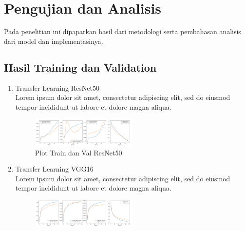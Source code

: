\section{Pengujian dan Analisis}
\label{sec:PengujianAnalisa}

Pada penelitian ini dipaparkan hasil dari metodologi serta pembahasan analisis dari model dan implementasinya.

\subsection{Hasil Training dan Validation}
\label{sec:hasiltrainval}

\begin{enumerate}[nolistsep]

  \item Transfer Learning ResNet50 \\
  Lorem ipsum dolor sit amet, consectetur adipiscing elit, sed do eiusmod tempor incididunt ut labore et dolore magna 
  aliqua.

  \begin{figure} [ht]
    \centering
    \includegraphics[width=0.5\textwidth]{gambar/PlotResNet50.png}

    \caption{Plot Train dan Val ResNet50}
    \label{fig:PlotResNet50}
  \end{figure}

  \item Transfer Learning VGG16 \\
  Lorem ipsum dolor sit amet, consectetur adipiscing elit, sed do eiusmod tempor incididunt ut labore et dolore magna 
  aliqua.

  \begin{figure} [ht]
    \centering
    \includegraphics[width=0.5\textwidth]{gambar/PlotVGG16.png}


\end{figure}
\end{enumerate}
